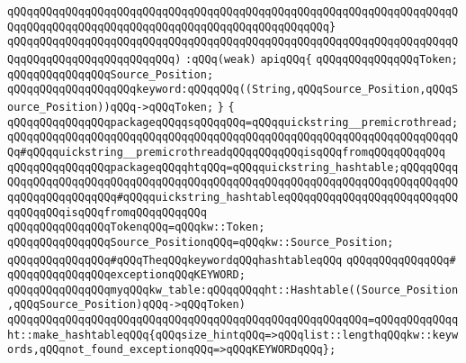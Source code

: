 \verb|qQQqqQQqqQQqqQQqqQQqqQQqqQQqqQQqqQQqqQQqqQQqqQQqqQQqqQQqqQQqqQQqqQQqqQQqqQQqqQQqqQQqqQQqqQQqqQQqqQQqqQQqqQQqqQQqqQQqqQQq}|\newline
\verb|qQQqqQQqqQQqqQQqqQQqqQQqqQQqqQQqqQQqqQQqqQQqqQQqqQQqqQQqqQQqqQQqqQQqqQQqqQQqqQQqqQQqqQQqqQQqqQQq)|\newline
\verb|:qQQq(weak)|\newline
\verb|apiqQQq{|\newline
\verb|qQQqqQQqqQQqqQQqToken;|\newline
\verb|qQQqqQQqqQQqqQQqSource_Position;|\newline
\verb|qQQqqQQqqQQqqQQqqQQqkeyword:qQQqqQQq((String,qQQqSource_Position,qQQqSource_Position))qQQq->qQQqToken;|\newline
\verb|}|\newline
\verb|{|\newline
\verb|qQQqqQQqqQQqqQQqpackageqQQqqsqQQqqQQq=qQQqquickstring__premicrothread;qQQqqQQqqQQqqQQqqQQqqQQqqQQqqQQqqQQqqQQqqQQqqQQqqQQqqQQqqQQqqQQqqQQqqQQq#qQQqquickstring__premicrothreadqQQqqQQqqQQqisqQQqfromqQQqqQQqqQQq|\newline
\verb|qQQqqQQqqQQqqQQqpackageqQQqqhtqQQq=qQQqquickstring_hashtable;qQQqqQQqqQQqqQQqqQQqqQQqqQQqqQQqqQQqqQQqqQQqqQQqqQQqqQQqqQQqqQQqqQQqqQQqqQQqqQQqqQQqqQQqqQQqqQQq#qQQqquickstring_hashtableqQQqqQQqqQQqqQQqqQQqqQQqqQQqqQQqqQQqisqQQqfromqQQqqQQqqQQq|\newline
\newline
\verb|qQQqqQQqqQQqqQQqTokenqQQq=qQQqkw::Token;|\newline
\verb|qQQqqQQqqQQqqQQqSource_PositionqQQq=qQQqkw::Source_Position;|\newline
\newline
\verb|qQQqqQQqqQQqqQQq#qQQqTheqQQqkeywordqQQqhashtableqQQq|\newline
\verb|qQQqqQQqqQQqqQQq#|\newline
\verb|qQQqqQQqqQQqqQQqexceptionqQQqKEYWORD;|\newline
\newline
\verb|qQQqqQQqqQQqqQQqmyqQQqkw_table:qQQqqQQqqht::Hashtable((Source_Position,qQQqSource_Position)qQQq->qQQqToken)|\newline
\verb|qQQqqQQqqQQqqQQqqQQqqQQqqQQqqQQqqQQqqQQqqQQqqQQqqQQqqQQq=qQQqqQQqqQQqqht::make_hashtableqQQq{qQQqsize_hintqQQq=>qQQqlist::lengthqQQqkw::keywords,qQQqnot_found_exceptionqQQq=>qQQqKEYWORDqQQq};|\newline
